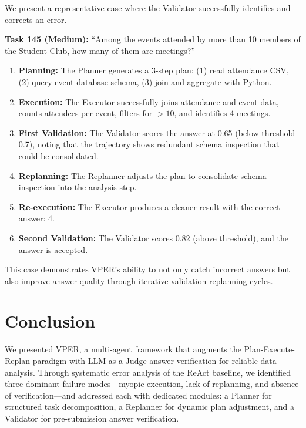 \documentclass{article}
\begin{document}
We present a representative case where the Validator successfully identifies and corrects an error.

\textbf{Task 145 (Medium):} ``Among the events attended by more than 10 members of the Student Club, how many of them are meetings?''

\begin{enumerate}[leftmargin=1.5em]
    \item \textbf{Planning:} The Planner generates a 3-step plan: (1) read attendance CSV, (2) query event database schema, (3) join and aggregate with Python.
    \item \textbf{Execution:} The Executor successfully joins attendance and event data, counts attendees per event, filters for $>10$, and identifies 4 meetings.
    \item \textbf{First Validation:} The Validator scores the answer at 0.65 (below threshold 0.7), noting that the trajectory shows redundant schema inspection that could be consolidated.
    \item \textbf{Replanning:} The Replanner adjusts the plan to consolidate schema inspection into the analysis step.
    \item \textbf{Re-execution:} The Executor produces a cleaner result with the correct answer: 4.
    \item \textbf{Second Validation:} The Validator scores 0.82 (above threshold), and the answer is accepted.
\end{enumerate}

This case demonstrates VPER's ability to not only catch incorrect answers but also improve answer quality through iterative validation-replanning cycles.


\section{Conclusion}

We presented VPER, a multi-agent framework that augments the Plan-Execute-Replan paradigm with LLM-as-a-Judge answer verification for reliable data analysis.
Through systematic error analysis of the ReAct baseline, we identified three dominant failure modes---myopic execution, lack of replanning, and absence of verification---and addressed each with dedicated modules: a Planner for structured task decomposition, a Replanner for dynamic plan adjustment, and a Validator for pre-submission answer verification.
\end{document}
